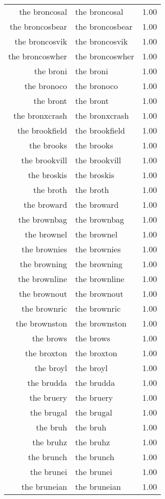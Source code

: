 \begin{table}[ht]
\begin{tabular}{rlr}
  the broncosal & the broncosal & 1.00 \\ 
  the broncosbear & the broncosbear & 1.00 \\ 
  the broncosvik & the broncosvik & 1.00 \\ 
  the broncoswher & the broncoswher & 1.00 \\ 
  the broni & the broni & 1.00 \\ 
  the bronoco & the bronoco & 1.00 \\ 
  the bront & the bront & 1.00 \\ 
  the bronxcrash & the bronxcrash & 1.00 \\ 
  the brookfield & the brookfield & 1.00 \\ 
  the brooks & the brooks & 1.00 \\ 
  the brookvill & the brookvill & 1.00 \\ 
  the broskis & the broskis & 1.00 \\ 
  the broth & the broth & 1.00 \\ 
  the broward & the broward & 1.00 \\ 
  the brownbag & the brownbag & 1.00 \\ 
  the brownel & the brownel & 1.00 \\ 
  the brownies & the brownies & 1.00 \\ 
  the browning & the browning & 1.00 \\ 
  the brownline & the brownline & 1.00 \\ 
  the brownout & the brownout & 1.00 \\ 
  the brownric & the brownric & 1.00 \\ 
  the brownston & the brownston & 1.00 \\ 
  the brows & the brows & 1.00 \\ 
  the broxton & the broxton & 1.00 \\ 
  the broyl & the broyl & 1.00 \\ 
  the brudda & the brudda & 1.00 \\ 
  the bruery & the bruery & 1.00 \\ 
  the brugal & the brugal & 1.00 \\ 
  the bruh & the bruh & 1.00 \\ 
  the bruhz & the bruhz & 1.00 \\ 
  the brunch & the brunch & 1.00 \\ 
  the brunei & the brunei & 1.00 \\ 
  the bruneian & the bruneian & 1.00 \\ 

\end{tabular}
\end{table}
